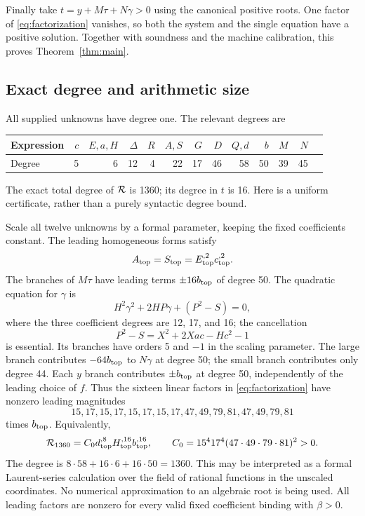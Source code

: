 Finally take $t=y+M\tau+N\gamma>0$ using the canonical positive roots.
One factor of \eqref{eq:factorization} vanishes, so both the system and
the single equation have a positive solution. Together with soundness and
the machine calibration, this proves Theorem~\ref{thm:main}.

\subsection{Exact degree and arithmetic size}

All supplied unknowns have degree one. The relevant degrees are
\begin{center}\small
\begin{tabular}{lrrrrrrrrrrrr}
\toprule
Expression &$c$&$E,a,H$&$\Delta$&$R$&$A,S$&$G$&$D$&$Q,d$&$b$&$M$&$N$\\
\midrule
Degree &5&6&12&4&22&17&46&58&50&39&45\\
\bottomrule
\end{tabular}
\end{center}
The exact total degree of $\mathcal R$ is 1360; its degree in $t$ is 16.
Here is a uniform certificate, rather than a purely syntactic degree bound.

Scale all twelve unknowns by a formal parameter, keeping the fixed
coefficients constant. The leading homogeneous forms satisfy
\[
 A_{\rm top}=S_{\rm top}=E_{\rm top}^{,2}c_{\rm top}^{,2}.
\]
The branches of $M\tau$ have leading terms $\pm16b_{\rm top}$ of degree 50.
The quadratic equation for $\gamma$ is
\[
 H^2\gamma^2+2HP\gamma+(P^2-S)=0,
\]
where the three coefficient degrees are 12, 17, and 16; the cancellation
\[
 P^2-S=X^2+2Xac-Hc^2-1
\]
is essential. Its branches have orders 5 and $-1$ in the scaling parameter.
The large branch contributes $-64b_{\rm top}$ to $N\gamma$ at degree 50;
the small branch contributes only degree 44. Each $y$ branch contributes
$\pm b_{\rm top}$ at degree 50, independently of the leading choice of $f$.
Thus the sixteen linear factors in \eqref{eq:factorization} have nonzero
leading magnitudes
\[
 15,17,15,17,15,17,15,17,
 47,49,79,81,47,49,79,81
\]
times $b_{\rm top}$. Equivalently,
\begin{equation}
 \mathcal R_{1360}=C_0d_{\rm top}^{,8}H_{\rm top}^{,16}b_{\rm top}^{,16},
 \qquad C_0=15^4 17^4(47\cdot49\cdot79\cdot81)^2>0.
 \label{eq:leader}
\end{equation}
The degree is $8\cdot58+16\cdot6+16\cdot50=1360$.
This may be interpreted as a formal Laurent-series calculation over the
field of rational functions in the unscaled coordinates. No numerical
approximation to an algebraic root is being used. All leading factors are
nonzero for every valid fixed coefficient binding with $\beta>0$.

